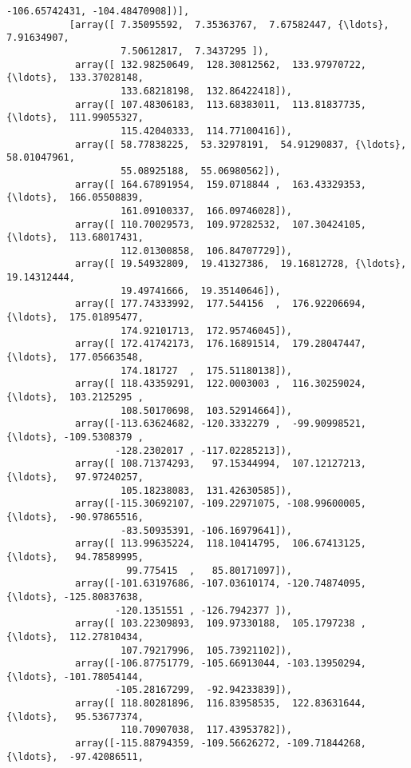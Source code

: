 \documentclass[11pt]{article}
\begin{document}
\begin{Verbatim}[commandchars=\\\{\}]
                   -106.65742431, -104.48470908])],
           [array([ 7.35095592,  7.35363767,  7.67582447, {\ldots},  7.91634907,
                    7.50612817,  7.3437295 ]),
            array([ 132.98250649,  128.30812562,  133.97970722, {\ldots},  133.37028148,
                    133.68218198,  132.86422418]),
            array([ 107.48306183,  113.68383011,  113.81837735, {\ldots},  111.99055327,
                    115.42040333,  114.77100416]),
            array([ 58.77838225,  53.32978191,  54.91290837, {\ldots},  58.01047961,
                    55.08925188,  55.06980562]),
            array([ 164.67891954,  159.0718844 ,  163.43329353, {\ldots},  166.05508839,
                    161.09100337,  166.09746028]),
            array([ 110.70029573,  109.97282532,  107.30424105, {\ldots},  113.68017431,
                    112.01300858,  106.84707729]),
            array([ 19.54932809,  19.41327386,  19.16812728, {\ldots},  19.14312444,
                    19.49741666,  19.35140646]),
            array([ 177.74333992,  177.544156  ,  176.92206694, {\ldots},  175.01895477,
                    174.92101713,  172.95746045]),
            array([ 172.41742173,  176.16891514,  179.28047447, {\ldots},  177.05663548,
                    174.181727  ,  175.51180138]),
            array([ 118.43359291,  122.0003003 ,  116.30259024, {\ldots},  103.2125295 ,
                    108.50170698,  103.52914664]),
            array([-113.63624682, -120.3332279 ,  -99.90998521, {\ldots}, -109.5308379 ,
                   -128.2302017 , -117.02285213]),
            array([ 108.71374293,   97.15344994,  107.12127213, {\ldots},   97.97240257,
                    105.18238083,  131.42630585]),
            array([-115.30692107, -109.22971075, -108.99600005, {\ldots},  -90.97865516,
                    -83.50935391, -106.16979641]),
            array([ 113.99635224,  118.10414795,  106.67413125, {\ldots},   94.78589995,
                     99.775415  ,   85.80171097]),
            array([-101.63197686, -107.03610174, -120.74874095, {\ldots}, -125.80837638,
                   -120.1351551 , -126.7942377 ]),
            array([ 103.22309893,  109.97330188,  105.1797238 , {\ldots},  112.27810434,
                    107.79217996,  105.73921102]),
            array([-106.87751779, -105.66913044, -103.13950294, {\ldots}, -101.78054144,
                   -105.28167299,  -92.94233839]),
            array([ 118.80281896,  116.83958535,  122.83631644, {\ldots},   95.53677374,
                    110.70907038,  117.43953782]),
            array([-115.88794359, -109.56626272, -109.71844268, {\ldots},  -97.42086511,

\end{Verbatim}
\end{document}
